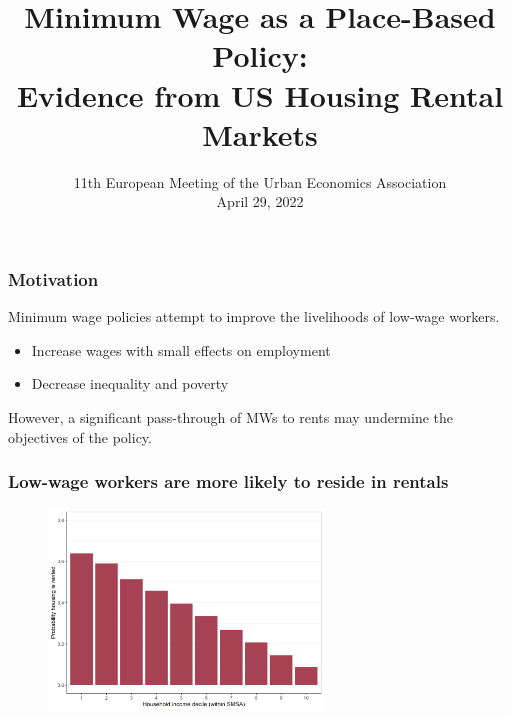 \documentclass[aspectratio=169, t]{beamer}
\title{Minimum Wage as a Place-Based Policy: \\ 
       Evidence from US Housing Rental Markets}
\date{11th European Meeting of the Urban Economics Association \\ 
      \vspace{1mm} April 29, 2022}
\author{\textbf{Santiago Hermo}\inst{1} \and Diego Gentile Passaro\inst{1} \and \and Gabriele Borg\inst{2}}
\institute{\inst{1} Brown University $\quad$ \inst{2} AWS}
\begin{document}
\maketitle



\begin{frame}
    \frametitle{Motivation}
    
    Minimum wage policies attempt to improve the livelihoods of low-wage workers.
    \begin{itemize}
        \item Increase wages with small effects on employment
        {\small \color{gray} \parencite[e.g.,][]{CegnizEtAl2019}}
        \item Decrease inequality {\small \color{gray} \parencite{AutorEtAl2016}}
        and poverty {\small \color{gray} \parencite{Dube2019Income}}
    \end{itemize}
    
    \vspace{1mm}
    However, %
    a significant pass-through of MWs to rents may undermine the objectives of the policy.

\end{frame}

\begin{frame}
    \frametitle{Low-wage workers are more likely to reside in rentals}
    
    \begin{figure}
        \includegraphics[width = 0.65\textwidth]{../../input/share_renters.png}
    \end{figure}

\end{frame}
\end{document}
